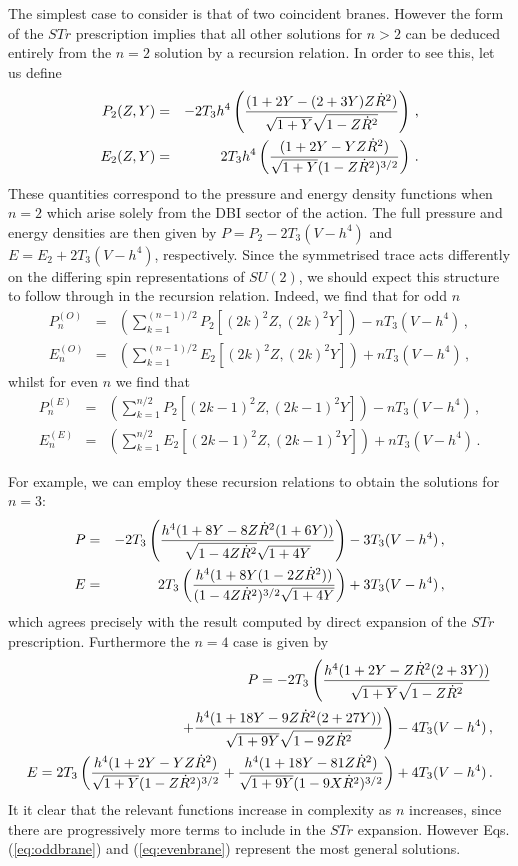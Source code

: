 The simplest case to consider is that of two coincident branes. However
the form of the $STr$ prescription implies that all other solutions for 
$n>2$ can be deduced entirely from the $n=2$ solution by a recursion relation. 
In order to see this, let us define 
% 
\begin{eqnarray}
\label{eq:2brane}
P_2(Z,Y) &=& - 2 T_3 h^4 \left(\frac{(1+2Y -
(2+3Y)Z\dot{R}^2)}{\sqrt{1+Y}\sqrt{1-Z\dot{R}^2}}\right) \,, \nonumber \\
E_2(Z,Y) &=& 2 T_3 h^4 \left(\frac{(1+2Y -
YZ\dot{R}^2)}{\sqrt{1+Y}(1-Z\dot{R}^2)^{3/2}}\right) \,.
\end{eqnarray}
% 
These quantities correspond to the pressure and energy density functions 
when $n=2$ which arise solely from the DBI sector of the action.
The full pressure and energy densities are then 
given by $P = P_2 - 2T_3(V-h^4)$ and
$E = E_2 + 2T_3 (V-h^4)$, respectively.
Since the symmetrised trace acts differently on the differing spin
representations of $SU(2)$, we should expect this structure to follow
through in the recursion relation. Indeed, we find that for odd $n$
% 
\begin{eqnarray}
\label{eq:oddbrane}
P_n^{(O)} &=& \left(\sum_{k=1}^{(n-1)/2} P_2[(2k)^2Z, (2k)^2Y]
\right)-nT_3(V-h^4) \,, \nonumber \\
E_n^{(O)} &=& \left(\sum_{k=1}^{(n-1)/2} E_2[(2k)^2Z, (2k)^2Y] \right)+
nT_3(V-h^4) \,,
\end{eqnarray}
% 
whilst for even $n$ we find that
%  
\begin{eqnarray}
\label{eq:evenbrane}
P_n^{(E)} &=& \left(\sum_{k=1}^{n/2} P_2[(2k-1)^2Z, (2k-1)^2Y]
\right)-nT_3(V-h^4) \,, \nonumber \\
E_n^{(E)} &=& \left(\sum_{k=1}^{n/2} E_2[(2k-1)^2Z, (2k-1)^2Y] \right)+
nT_3(V-h^4) \,.
\end{eqnarray}
% 


For example, we can employ these recursion relations to obtain the 
solutions for $n=3$:  
% 
\begin{eqnarray}
P &=& - 2T_3 \left(\frac{h^4
(1+8Y-8Z\dot{R}^2(1+6Y))}{\sqrt{1-4Z\dot{R}^2}\sqrt{1+4Y}}\right)
 -3T_3(V-h^4) \,, \nonumber \\
E &=&  2T_3 \left(\frac{h^4
(1+8Y(1-2Z\dot{R}^2))}{(1-4Z\dot{R}^2)^{3/2}\sqrt{1+4Y}}\right) +3T_3(V-h^4) \,,
\end{eqnarray}
% 
which agrees precisely with the result computed by direct 
expansion of the $STr$ prescription. Furthermore the $n=4$ case is given by 
% 
\begin{eqnarray}
P = -2T_3\left(\frac{h^4
(1+2Y-Z\dot{R}^2(2+3Y))}{\sqrt{1+Y}\sqrt{1-Z\dot{R}^2}} \right. 
\nonumber \\
\left. +\frac{h^4(1+18Y-9Z\dot{R}^2(2+27Y))}
{\sqrt{1+9Y}\sqrt{1-9Z\dot{R}^2}}\right) 
 -4T_3(V-h^4) \,, \nonumber \\
E =  2T_3 \left(\frac{h^4(1+2Y-YZ\dot{R}^2)}{\sqrt{1+Y}(1-Z\dot{R}^2)^{3/2}} +
\frac{h^4(1+18Y-81Z\dot{R}^2)}{\sqrt{1+9Y}(1-9X\dot{R}^2)^{3/2}} \right)
+4T_3(V-h^4) \, .
\end{eqnarray}
% 
It it clear that the relevant functions increase in complexity as 
$n$ increases, since there are progressively more
terms to include in the $STr$ expansion. However Eqs. (\ref{eq:oddbrane}) and (\ref{eq:evenbrane})
represent the most general
solutions. 


